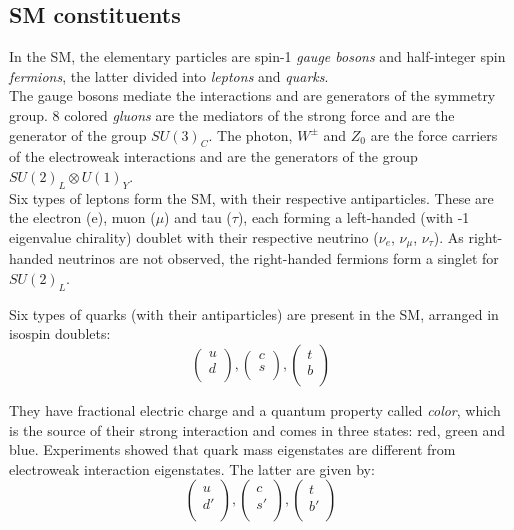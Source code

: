 \documentclass[a4paper,twoside,12pt]{book}
\begin{document}
\subsection*{SM constituents}
In the SM, the elementary particles are spin-1 \textit{gauge bosons} and half-integer spin \textit{fermions}, the latter divided into \textit{leptons} and \textit{quarks}. \\

The gauge bosons mediate the interactions and are generators of the
symmetry group. 8 colored \textit{gluons} are the mediators of the strong force and
are the generator of the group $SU (3)_{C}$. The photon, $W^{\pm}$ and $Z_{0}$ 
are the force carriers of the electroweak interactions and are the generators of the group
$SU (2)_{L} \otimes U (1)_{Y}$. \\

Six types of leptons form the SM, with their respective antiparticles. These are the electron (e),
muon ($\mu$) and tau ($\tau$), each forming a left-handed (with -1 eigenvalue chirality) doublet with their respective neutrino ($\nu_{e}$, $\nu_{\mu}$, $\nu_{\tau}$). As 
right-handed neutrinos are not observed, the right-handed fermions form a singlet for
$SU (2)_{L}$. 

Six types of quarks (with their antiparticles) are present in the SM, arranged in isospin doublets:\\

 \[ 
 \left( \begin{array}{c}
u \\
d  \\
\end{array} \right), 
 \left( \begin{array}{c}
c \\
s  \\
\end{array} \right), 
 \left( \begin{array}{c}
t \\
b  \\
\end{array} \right)
\]

They have fractional electric charge and a quantum property called \textit{color}, which
is the source of their strong interaction and comes in three states: red, green and blue. 
Experiments showed that quark mass eigenstates are different from electroweak
interaction eigenstates. The latter are given by:\\

 \[ 
 \left( \begin{array}{c}
u \\
d'  \\
\end{array} \right), 
 \left( \begin{array}{c}
c \\
s'  \\
\end{array} \right), 
 \left( \begin{array}{c}
t \\
b'  \\
\end{array} \right)
\]
\end{document}
